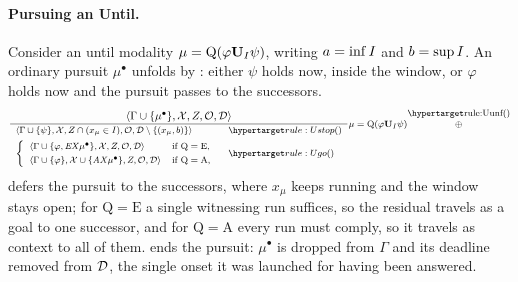 \paragraph{Pursuing an Until.}





Consider an until modality $\mu=\mathrm{Q}(\varphi\mathbf{U}_I\psi)$, writing
$a=\inf I$ and $b=\sup I$. An ordinary pursuit $\mu^\bullet$ unfolds by : either
$\psi$ holds now, inside the window, or $\varphi$ holds now and the pursuit passes to the
successors.
%
%
\vspace{-0.1cm}
\[
\footnotesize
\frac{\tup{\Gamma\cup\{\mu^\bullet\}}{\Ctx}{Z}{\obligations}{\Deadline}}
{\begin{array}{ll}
\tup{\Gamma\cup\{\psi\}}{\Ctx}{Z\cap(x_\mu\in\kI)}{\obligations}{\Deadline\setminus\{(x_\mu,b)\}}
  & \ruleanchor{Ustop}\\[4pt]
\left\{
\begin{array}{ll}
\tup{\Gamma\cup\{\varphi,\EX\mu^\bullet\}}{\Ctx}{Z}{\obligations}{\Deadline}
  & \text{if } \mathrm{Q}=\mathrm{E},\\[3pt]
\tup{\Gamma\cup\{\varphi\}}{\Ctx\cup\{\AX\mu^\bullet\}}{Z}{\obligations}{\Deadline}
  & \text{if } \mathrm{Q}=\mathrm{A},
\end{array}
\right.
& \ruleanchor{Ugo}
\end{array}}
\shortstack{
$\mu=\mathrm{Q}(\varphi\mathbf{U}_\kI\psi)$}
\shortstack{\ruleanchor{Uunf}\\\ORn}
\]
 defers the pursuit to the successors, where $x_\mu$ keeps running and the window
stays open; for $\mathrm{Q}=\mathrm{E}$ a single witnessing run suffices, so the residual travels
as a goal to one successor, and for $\mathrm{Q}=\mathrm{A}$ every run must comply, so it travels
as context to all of them.  ends the pursuit: $\mu^\bullet$ is dropped from
$\Gamma$ and its deadline removed from $\mathcal{D}$, the single onset it was launched for having
been answered.

